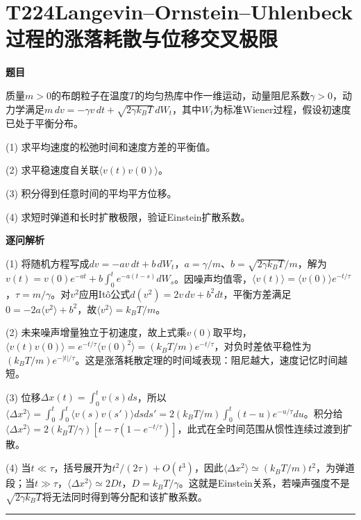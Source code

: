 \documentclass[UTF8,a4paper,11pt,oneside,openany]{ctexbook}
\begin{document}
\section*{T224\quad Langevin–Ornstein–Uhlenbeck过程的涨落耗散与位移交叉极限}
\textbf{题目}\par
质量$m>0$的布朗粒子在温度$T$的均匀热库中作一维运动，动量阻尼系数$\gamma>0$，动力学满足$m\,dv=-\gamma v\,dt+\sqrt{2\gamma k_BT}\,dW_t$，其中$W_t$为标准Wiener过程，假设初速度已处于平衡分布。
\par\smallskip\noindent (1) 求平均速度的松弛时间和速度方差的平衡值。
\par\smallskip\noindent (2) 求平稳速度自关联$\langle v(t)v(0)\rangle$。
\par\smallskip\noindent (3) 积分得到任意时间的平均平方位移。
\par\smallskip\noindent (4) 求短时弹道和长时扩散极限，验证Einstein扩散系数。
\par\medskip\textbf{逐问解析}\par
\par\smallskip\noindent (1) 将随机方程写成$dv=-av\,dt+b\,dW_t$，$a=\gamma/m$、$b=\sqrt{2\gamma k_BT}/m$，解为$v(t)=v(0)e^{-at}+b\int_0^te^{-a(t-s)}dW_s$。因噪声均值零，$\langle v(t)\rangle=\langle v(0)\rangle e^{-t/\tau}$，$\tau=m/\gamma$。对$v^2$应用Itô公式$d(v^2)=2v\,dv+b^2dt$，平衡方差满足$0=-2a\langle v^2\rangle+b^2$，故$\langle v^2\rangle=k_BT/m$。
\par\smallskip\noindent (2) 未来噪声增量独立于初速度，故上式乘$v(0)$取平均，$\langle v(t)v(0)\rangle=e^{-t/\tau}\langle v(0)^2\rangle=(k_BT/m)e^{-t/\tau}$，对负时差依平稳性为$(k_BT/m)e^{-|t|/\tau}$。这是涨落耗散定理的时间域表现：阻尼越大，速度记忆时间越短。
\par\smallskip\noindent (3) 位移$\Delta x(t)=\int_0^t v(s)ds$，所以$\langle\Delta x^2\rangle=\int_0^t\int_0^t\langle v(s)v(s')\rangle dsds'=2(k_BT/m)\int_0^t(t-u)e^{-u/\tau}du$。积分给$\langle\Delta x^2\rangle=2(k_BT/\gamma)[t-\tau(1-e^{-t/\tau})]$，此式在全时间范围从惯性连续过渡到扩散。
\par\smallskip\noindent (4) 当$t\ll\tau$，括号展开为$t^2/(2\tau)+O(t^3)$，因此$\langle\Delta x^2\rangle\simeq(k_BT/m)t^2$，为弹道段；当$t\gg\tau$，$\langle\Delta x^2\rangle\simeq2Dt$，$D=k_BT/\gamma$。这就是Einstein关系，若噪声强度不是$\sqrt{2\gamma k_BT}$将无法同时得到等分配和该扩散系数。
\par\medskip\hrule\medskip
\end{document}
